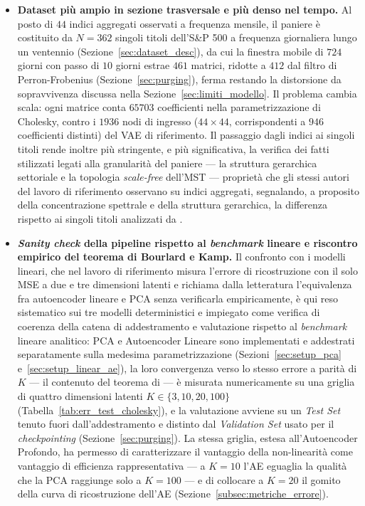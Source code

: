 \begin{itemize}
    \item \textbf{Dataset più ampio in sezione trasversale e più denso nel tempo.} Al posto di $44$ indici aggregati osservati a frequenza mensile, il paniere è costituito da $N=362$ singoli titoli dell'S\&P 500 a frequenza giornaliera lungo un ventennio (Sezione~\ref{sec:dataset_desc}), da cui la finestra mobile di $724$ giorni con passo di $10$ giorni estrae $461$ matrici, ridotte a $412$ dal filtro di Perron-Frobenius (Sezione~\ref{sec:purging}), ferma restando la distorsione da sopravvivenza discussa nella Sezione~\ref{sec:limiti_modello}. Il problema cambia scala: ogni matrice conta $65703$ coefficienti nella parametrizzazione di Cholesky, contro i $1936$ nodi di ingresso ($44 \times 44$, corrispondenti a $946$ coefficienti distinti) del VAE di riferimento. Il passaggio dagli indici ai singoli titoli rende inoltre più stringente, e più significativa, la verifica dei fatti stilizzati legati alla granularità del paniere --- la struttura gerarchica settoriale e la topologia \emph{scale-free} dell'MST --- proprietà che gli stessi autori del lavoro di riferimento osservano su indici aggregati, segnalando, a proposito della concentrazione spettrale e della struttura gerarchica, la differenza rispetto ai singoli titoli analizzati da \citet{marti2019corrgan}.
    \item \textbf{\emph{Sanity check} della pipeline rispetto al \emph{benchmark} lineare e riscontro empirico del teorema di Bourlard e Kamp.} Il confronto con i modelli lineari, che nel lavoro di riferimento misura l'errore di ricostruzione con il solo MSE a due e tre dimensioni latenti e richiama dalla letteratura l'equivalenza fra autoencoder lineare e PCA senza verificarla empiricamente, è qui reso sistematico sui tre modelli deterministici e impiegato come verifica di coerenza della catena di addestramento e valutazione rispetto al \emph{benchmark} lineare analitico: PCA e Autoencoder Lineare sono implementati e addestrati separatamente sulla medesima parametrizzazione (Sezioni~\ref{sec:setup_pca} e~\ref{sec:setup_linear_ae}), la loro convergenza verso lo stesso errore a parità di $K$ --- il contenuto del teorema di \citet{bourlard1988autoassociation} --- è misurata numericamente su una griglia di quattro dimensioni latenti $K \in \{3, 10, 20, 100\}$ (Tabella~\ref{tab:err_test_cholesky}), e la valutazione avviene su un \emph{Test Set} tenuto fuori dall'addestramento e distinto dal \emph{Validation Set} usato per il \emph{checkpointing} (Sezione~\ref{sec:purging}). La stessa griglia, estesa all'Autoencoder Profondo, ha permesso di caratterizzare il vantaggio della non-linearità come vantaggio di efficienza rappresentativa --- a $K=10$ l'AE eguaglia la qualità che la PCA raggiunge solo a $K=100$ --- e di collocare a $K=20$ il gomito della curva di ricostruzione dell'AE (Sezione~\ref{subsec:metriche_errore}).

\end{itemize}
